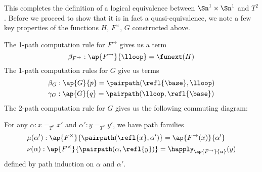\documentclass[
%
%
11pt %
]{article}
\begin{document}
This completes the definition of a logical equivalence between $\Sn^1 \times \Sn^1$ and $T^2$. Before we proceed to show that it is in fact a quasi-equivalence, we note a few key properties of the functions $H$, $F^\times$, $G$ constructed above.

The 1-path computation rule for $F^\to$ gives us a term
\[ \beta_{F^\to} : \ap{F^\to}{\lloop} = \funext(H) \]
The 1-path computation rules for $G$ give us terms
\begin{align*}
& \beta_G : \ap{G}{p} = \pairpath(\refl{\base},\lloop)\\
& \gamma_G : \ap{G}{q} =\pairpath(\lloop, \refl{\base})
\end{align*}
The 2-path computation rule for $G$ gives us the following commuting diagram:
\begin{center}
\end{center}
For any $\alpha : x =_{T^2} x'$ and $\alpha' : y =_{T^2} y'$, we have path families
\begin{align*}
& \mu(\alpha') : \ap{F^\times}{\pairpath(\refl{x},\alpha')} = \ap{F^\to(x)}{\alpha'}\\
& \nu(\alpha) : \ap{F^\times}{\pairpath(\alpha,\refl{y})} = \happly_{\ap{F^\to}{\alpha}}(y)
\end{align*}
defined by path induction on $\alpha$ and $\alpha'$.
\end{document}
